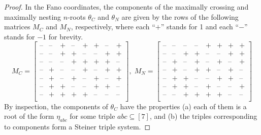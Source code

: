 \documentclass[11pt]{amsart}
\theoremstyle{plain}
\theoremstyle{definition}
\theoremstyle{remark}
\numberwithin{equation}{subsection}
\newcommand{\se}{\subseteq}
\begin{document}
\begin{proof}
In the Fano coordinates, the components of the maximally crossing and maximally
nesting $n$-roots $\theta_C$ and $\theta_N$ are given by the rows of the
following matrices $M_C$ and $M_N$, respectively, where each ``$+$'' stands for
1 and each ``$-$'' stands for $-1$ for brevity. 
\begin{equation} M_C = \left[ \begin{matrix} {\text{--}} & {\text{--}} &
      {\text{+}} & {\text{--}} & {\text{+}} & {\text{+}} & {\text{--}} &
      {\text{+}}\\ {\text{--}} & {\text{--}} & {\text{+}} & {\text{+}} &
      {\text{--}} & {\text{--}} & {\text{+}} & {\text{+}}\\ {\text{--}} &
      {\text{--}} & {\text{--}} & {\text{+}} & {\text{+}} & {\text{+}} &
      {\text{+}} & {\text{--}}\\ {\text{--}} & {\text{+}} & {\text{--}} &
      {\text{--}} & {\text{+}} & {\text{--}} & {\text{+}} & {\text{+}}\\
      {\text{--}} & {\text{+}} & {\text{--}} & {\text{+}} & {\text{--}} &
      {\text{+}} & {\text{--}} & {\text{+}}\\ {\text{--}} & {\text{+}} &
      {\text{+}} & {\text{--}} & {\text{--}} & {\text{+}} & {\text{+}} &
      {\text{--}}\\ {\text{--}} & {\text{+}} & {\text{+}} & {\text{+}} &
      {\text{+}} & {\text{--}} & {\text{--}} & {\text{--}}\\
\end{matrix} \right], \; M_N = \left[ \begin{matrix} {\text{--}} & {\text{--}}
    & {\text{--}} & {\text{--}} & {\text{+}} & {\text{+}} & {\text{+}} &
    {\text{+}}\\ {\text{--}} & {\text{--}} & {\text{+}} & {\text{+}} &
    {\text{--}} & {\text{--}} & {\text{+}} & {\text{+}}\\ {\text{--}} &
    {\text{+}} & {\text{--}} & {\text{+}} & {\text{--}} & {\text{+}} &
    {\text{--}} & {\text{+}}\\ {\text{--}} & {\text{+}} & {\text{--}} &
    {\text{+}} & {\text{+}} & {\text{--}} & {\text{+}} & {\text{--}}\\
    {\text{--}} & {\text{+}} & {\text{+}} & {\text{--}} & {\text{--}} &
    {\text{+}} & {\text{+}} & {\text{--}}\\ {\text{--}} & {\text{+}} &
    {\text{+}} & {\text{--}} & {\text{+}} & {\text{--}} & {\text{--}} &
    {\text{+}}\\ {\text{--}} & {\text{--}} & {\text{+}} & {\text{+}} &
    {\text{+}} & {\text{+}} & {\text{--}} & {\text{--}}\\
\end{matrix} \right]
\end{equation}
By inspection, the components of $\theta_C$ have the properties (a) each of them
is a root of the form $\eta_{abc}$ for some triple $abc\se [7]$, and (b) the
triples corresponding to components form a Steiner triple system.


\end{proof}
\end{document}
